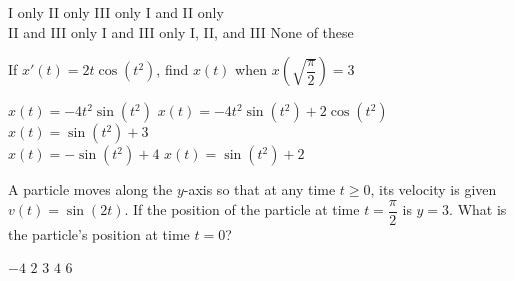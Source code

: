 \begin{questions}
    \begin{oneparchoices}
        \choice I only 
        \choice II only
        \choice III only
        \choice I and II only \\[11pt]
        \makebox[0.035\textwidth] \choice II and III only
        \choice I and III only
        \choice I, II, and III
        \choice None of these
    \end{oneparchoices} \par \horizontalline

    \question If $x'(t) = 2t\cos \left(t^2\right)$, find $x(t)$ when $x\left(\sqrt{\dfrac{\pi}{2}}\right) = 3$ \\

    \begin{oneparchoices}
        \choice $x(t) = -4t^2\sin \left(t^2\right)$
        \choice $x(t) = -4t^2\sin \left(t^2\right) + 2\cos \left(t^2\right)$
        \choice $x(t) = \sin \left(t^2\right) + 3$ \\[11pt]
        \makebox[0.17\textwidth] \choice $x(t) = -\sin \left(t^2\right) + 4$ 
        \makebox[0.2\textwidth] \choice $x(t) = \sin \left(t^2\right) + 2$
    \end{oneparchoices} \par \horizontalline

    \question A particle moves along the $y$-axis so that at any time $t \geq 0$, its velocity is given $v(t) = \sin (2t)$. If the position of the particle at time $t = \dfrac{\pi}{2}$ is $y = 3$. What is the particle's position at time $t = 0$? \\

    \begin{oneparchoices}
        \choice $-4$
        \choice $2$
        \choice $3$
        \choice $4$
        \choice $6$
    \end{oneparchoices} \par \horizontalline
\end{questions}